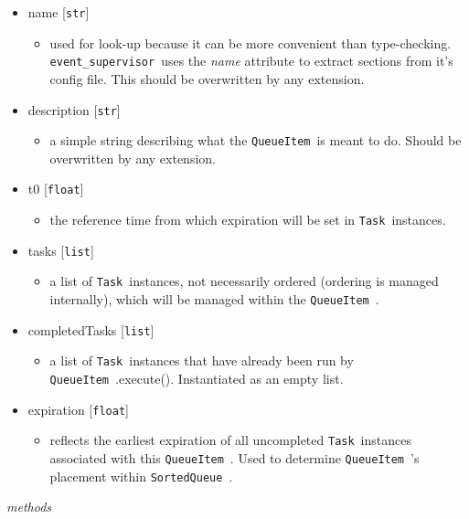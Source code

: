 \documentclass{article}
\newcommand{\SortedQueue}{\texttt{SortedQueue}~}
\newcommand{\QueueItem}{\texttt{QueueItem}~}
\newcommand{\Task}{\texttt{Task}~}
\newcommand{\eventSupervisor}{\texttt{event\_supervisor}~}
\begin{document}
\begin{itemize}
    \item{name [\texttt{str}]
        \begin{itemize}
            \item{used for look-up because it can be more convenient than type-checking. \eventSupervisor uses the \textit{name} attribute to extract sections from it's config file. This should be overwritten by any extension.}
        \end{itemize}
         }
    \item{description [\texttt{str}]
        \begin{itemize}
            \item{a simple string describing what the \QueueItem is meant to do. Should be overwritten by any extension.}
        \end{itemize}
         }
    \item{t0 [\texttt{float}]
        \begin{itemize}
            \item{the reference time from which expiration will be set in \Task instances.}
        \end{itemize}
         }
    \item{tasks [\texttt{list}]
        \begin{itemize}
            \item{a list of \Task instances, not necessarily ordered (ordering is managed internally), which will be managed within the \QueueItem.}
        \end{itemize}
         }
    \item{completedTasks [\texttt{list}]
        \begin{itemize}
            \item{a list of \Task instances that have already been run by \QueueItem.execute(). Instantiated as an empty list.}
        \end{itemize}
         }
    \item{expiration [\texttt{float}]
        \begin{itemize}
            \item{reflects the earliest expiration of all uncompleted \Task instances associated with this \QueueItem. Used to determine \QueueItem's placement within \SortedQueue.}
        \end{itemize}
         }
\end{itemize}

\noindent
\textit{methods}
\end{document}
